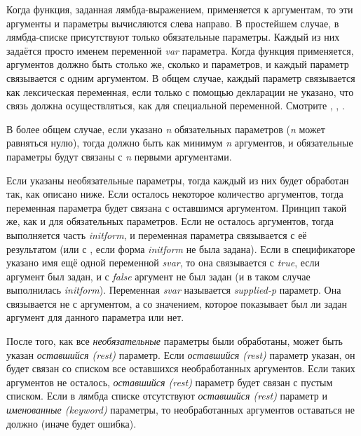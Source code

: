 Когда функция, заданная лямбда-выражением, применяется к аргументам, то эти
аргументы и параметры вычисляются слева направо.
В простейшем случае, в лямбда-списке присутствуют только обязательные
параметры. Каждый из них задаётся просто именем переменной \emph{var}
параметра.
Когда функция применяется, аргументов должно быть столько же, сколько и
параметров, и каждый параметр связывается с одним аргументом. В общем случае,
каждый параметр связывается как лексическая переменная, если только с помощью
декларации не указано, что связь должна осуществляться, как для специальной
переменной. Смотрите , , .

В более общем случае, если указано \emph{n} обязательных параметров
(\emph{n} может равняться нулю), тогда должно быть как минимум \emph{n}
аргументов, и обязательные параметры будут связаны с \emph{n} первыми
аргументами.

Если указаны необязательные параметры, тогда каждый из них будет обработан так,
как описано ниже. Если осталось некоторое количество аргументов, тогда
переменная параметра  будет связана с оставшимся аргументом. Принцип
такой же, как и для обязательных параметров. Если не осталось аргументов, тогда
выполняется часть \emph{initform}, и переменная
параметра связывается с её результатом (или с {\false}, если форма
\emph{initform} не была задана).
Если в спецификаторе указано имя ещё одной переменной \emph{svar}, то она
связывается с \emph{true}, если аргумент был задан, и с \emph{false}
аргумент не был задан (и в таком случае выполнилась \emph{initform}).
Переменная \emph{svar} называется \emph{supplied-p} параметр. Она
связывается не с аргументом, а со значением, которое показывает был ли задан
аргумент для данного параметра или нет.

После того, как все \emph{необязательные} параметры были обработаны, может
быть указан \emph{оставшийся (rest)} параметр.
Если \emph{оставшийся (rest)} параметр указан, он будет связан со списком все
оставшихся необработанных аргументов. Если таких аргументов не осталось,
\emph{оставшийся (rest)} параметр будет связан с пустым списком. Если в лямбда
списке отсутствуют \emph{оставшийся (rest)} параметр и \emph{именованные
  (keyword)} параметры, то необработанных аргументов оставаться не должно (иначе
будет ошибка).

